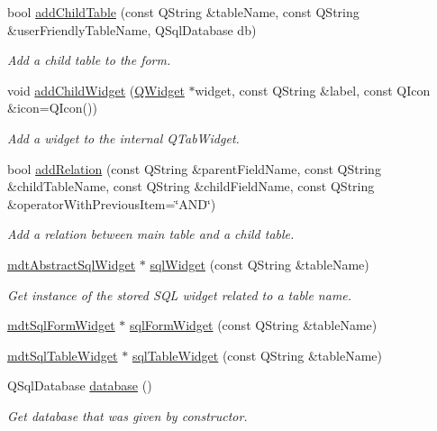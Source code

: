\begin{DoxyCompactItemize}
bool \hyperlink{classmdt_sql_form_a2a3af0bab78caee638b89aecdc1a2f62}{add\-Child\-Table} (const Q\-String \&table\-Name, const Q\-String \&user\-Friendly\-Table\-Name, Q\-Sql\-Database db)
\begin{DoxyCompactList}\small\item\em Add a child table to the form. \end{DoxyCompactList}\item 
void \hyperlink{classmdt_sql_form_a86174e002c2dd5496ab74a7eb67c614c}{add\-Child\-Widget} (\hyperlink{class_q_widget}{Q\-Widget} $\ast$widget, const Q\-String \&label, const Q\-Icon \&icon=Q\-Icon())
\begin{DoxyCompactList}\small\item\em Add a widget to the internal Q\-Tab\-Widget. \end{DoxyCompactList}\item 
bool \hyperlink{classmdt_sql_form_ab9bb1b548b71ef4e8547846b6aedec66}{add\-Relation} (const Q\-String \&parent\-Field\-Name, const Q\-String \&child\-Table\-Name, const Q\-String \&child\-Field\-Name, const Q\-String \&operator\-With\-Previous\-Item=\char`\"{}A\-N\-D\char`\"{})
\begin{DoxyCompactList}\small\item\em Add a relation between main table and a child table. \end{DoxyCompactList}\item 
\hyperlink{classmdt_abstract_sql_widget}{mdt\-Abstract\-Sql\-Widget} $\ast$ \hyperlink{classmdt_sql_form_a345555605914bf8198d093abdd3cda1e}{sql\-Widget} (const Q\-String \&table\-Name)
\begin{DoxyCompactList}\small\item\em Get instance of the stored S\-Q\-L widget related to a table name. \end{DoxyCompactList}\item 
\hyperlink{classmdt_sql_form_widget}{mdt\-Sql\-Form\-Widget} $\ast$ \hyperlink{classmdt_sql_form_a59dc3afec69c8b6a18ed7fccb42c70ad}{sql\-Form\-Widget} (const Q\-String \&table\-Name)
\item 
\hyperlink{classmdt_sql_table_widget}{mdt\-Sql\-Table\-Widget} $\ast$ \hyperlink{classmdt_sql_form_a6a17f32077fb7cc33139c3dc26a8d011}{sql\-Table\-Widget} (const Q\-String \&table\-Name)
\item 
Q\-Sql\-Database \hyperlink{classmdt_sql_form_ac8423f91a1f8a6fa7408cd61be86a89c}{database} ()
\begin{DoxyCompactList}\small\item\em Get database that was given by constructor. \end{DoxyCompactList}\item 

\end{DoxyCompactItemize}
